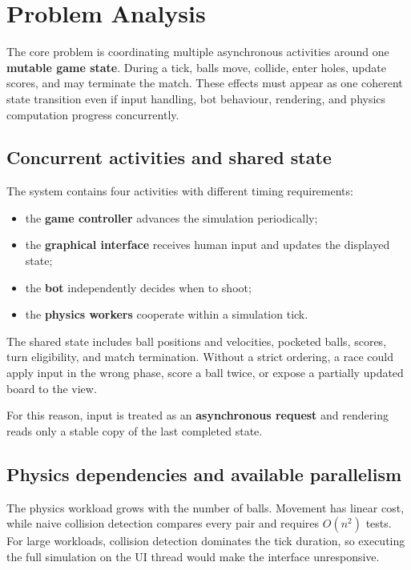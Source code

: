 \clearpage
\section{Problem Analysis}

The core problem is coordinating multiple asynchronous activities around one
\textbf{mutable game state}. During a tick, balls move, collide, enter holes,
update scores, and may terminate the match. These effects must appear as one
coherent state transition even if input handling, bot behaviour, rendering,
and physics computation progress concurrently.

\subsection{Concurrent activities and shared state}

The system contains four activities with different timing requirements:

\begin{itemize}
    \item the \textbf{game controller} advances the simulation periodically;
    \item the \textbf{graphical interface} receives human input and updates the displayed state;
    \item the \textbf{bot} independently decides when to shoot;
    \item the \textbf{physics workers} cooperate within a simulation tick.
\end{itemize}

The shared state includes ball positions and velocities, pocketed balls,
scores, turn eligibility, and match termination. Without a strict ordering, a
race could apply input in the wrong phase, score a ball twice, or expose a
partially updated board to the view.

For this reason, input is treated as an \textbf{asynchronous request} and
rendering reads only a stable copy of the last completed state.

\subsection{Physics dependencies and available parallelism}

The physics workload grows with the number of balls. Movement has linear cost,
while naive collision detection compares every pair and requires $O(n^2)$
tests. For large workloads, collision detection dominates the tick duration, so
executing the full simulation on the UI thread would make the interface
unresponsive.

